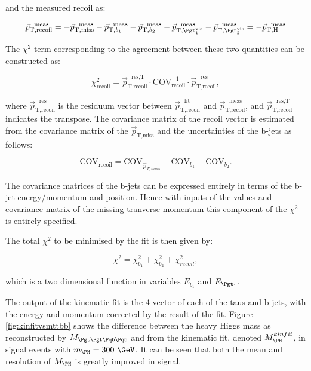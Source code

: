and the measured recoil as:

\begin{equation}
\vec{p}_{\text{T},\text{recoil}}^{\text{~~meas}} = -
\vec{p}_{\text{T},\text{miss}}^{\text{~~meas}} -
\vec{p}_{\text{T},b_{1}}^{\text{~~meas}} - \vec{p}_{\text{T},b_{2}}^{\text{~~meas}} -
\vec{p}_{\text{T},\Pgt_{1}^{\text{vis}}}^{\text{~~meas}} -
\vec{p}_{\text{T},\Pgt_{2}^{\text{vis}}}^{\text{~~meas}} = -
\vec{p}_{\text{T},\text{H}}^{\text{~~meas}}
\end{equation}

The $\chi^{2}$ term corresponding to the agreement between these two quantities
can be constructed as:

\begin{equation}
\chi_{\text{recoil}}^{2} = \vec{p}_{\text{T},\text{recoil}}^{\text{~~res},\text{T}} \cdot
\text{COV}_{\text{recoil}}^{-1} \cdot
\vec{p}_{\text{T},\text{recoil}}^{\text{~~res}} ,  
\end{equation}

where $\vec{p}_{\text{T},\text{recoil}}^{\text{~~res}}$ is the residuum vector between
$\vec{p}_{\text{T},\text{recoil}}^{\text{~~fit}}$
and $\vec{p}_{\text{T},\text{recoil}}^{\text{~~meas}}$, and
$\vec{p}_{\text{T},\text{recoil}}^{\text{~~res},\text{T}}$ indicates the
transpose. The covariance matrix of the recoil vector is estimated from
the covariance matrix of the $\vec{p}_{\text{T},\text{miss}}$ and the uncertainties of the b-jets as
follows:

\begin{equation}
\text{COV}_{\text{recoil}} = \text{COV}_{\vec{p}_{T,miss}} - \text{COV}_{b_{1}} -
\text{COV}_{b_{2}} .
\end{equation}

The covariance matrices of the b-jets can be expressed entirely in terms of the
b-jet energy/momentum and position. Hence with inputs of the values and
covariance matrix of the missing tranverse momentum this component of the
$\chi^{2}$ is entirely specified. 

The total $\chi^{2}$ to be minimised by the fit is then given by:

\begin{equation}
\chi^{2}= \chi_{b_{1}}^{2} + \chi_{b_{2}}^{2} + \chi_{recoil}^{2},
\end{equation}

which is a two dimensional function in variables $E_{b_{1}}$ and $E_{\Pgt_{1}}$.

The output of the kinematic fit is the 4-vector of each of the taus and b-jets,
with the energy and momentum corrected by the result of the fit. Figure
\ref{fig:kinfitvsmttbb}
shows the difference between the heavy Higgs mass as reconstructed by
$M_{\Pgt\Pgt \Pqb\Pqb}$ and from the kinematic fit, denoted $M_{\PH}^{kinfit}$,
in signal events with $m_{\PH}=300~\GeV$. It can
be seen that both the mean and resolution of $M_{\PH}$ is greatly improved in
signal.

